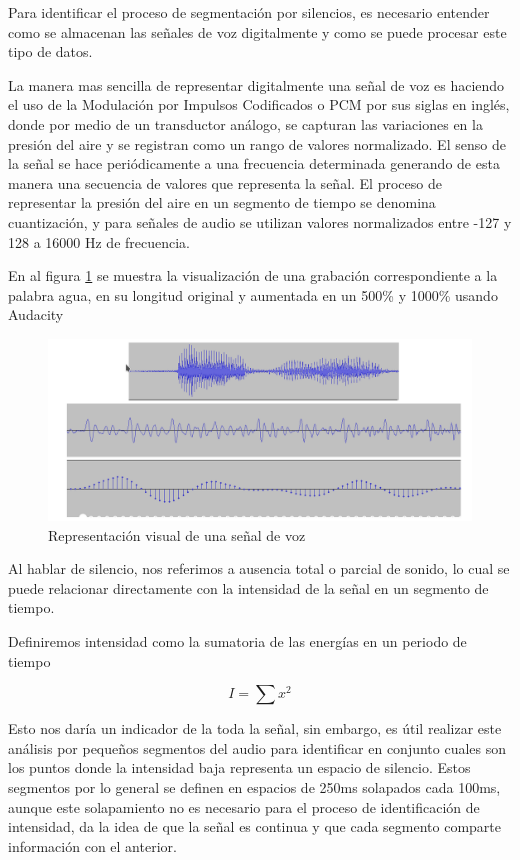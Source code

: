 \documentclass[a4paper,12pt,twoside]{report}
\begin{document}
Para identificar el proceso de segmentación por silencios, es necesario entender como se almacenan las señales de voz digitalmente y como se puede procesar este tipo de datos.

La manera mas sencilla de representar digitalmente una señal de voz es haciendo el uso de la Modulación por Impulsos Codificados o PCM por sus siglas en inglés, donde por medio de un transductor análogo, se capturan las variaciones en la presión del aire y se registran como un rango de valores normalizado. El senso de la señal se hace periódicamente a una frecuencia determinada generando de esta manera una secuencia de valores que representa la señal. El proceso de representar la presión del aire en un segmento de tiempo se denomina cuantización, y para señales de audio se utilizan valores normalizados entre -127 y 128 a 16000 Hz de frecuencia.

En al figura \ref{img:pcm} se muestra la visualización de una grabación correspondiente a la palabra agua, en su longitud original y aumentada en un 500\% y 1000\% usando Audacity \cite{audacity}
\begin{figure}[H]
\caption{Representación visual de una señal de voz \cite{hableomsDeVoz}}
\label{img:pcm}
\includegraphics[width=\textwidth]{imagenes/04_01_pcm.png}
\end{figure}

Al hablar de silencio, nos referimos a ausencia total o parcial de sonido, lo cual se puede relacionar directamente con la intensidad de la señal en un segmento de tiempo.

Definiremos intensidad como la sumatoria de las energías en un periodo de tiempo  \cite{Jurafsky2000SpeechRecognition}    

\begin{equation}
\label{eq:energy}
I = \sum{x^2}  
\end{equation}

Esto nos daría un indicador de la toda la señal, sin embargo, es útil realizar este análisis por pequeños segmentos del audio para identificar en conjunto cuales son los puntos donde la intensidad baja representa un espacio de silencio. Estos segmentos por lo general se definen en espacios de 250ms solapados cada 100ms, aunque este solapamiento no es necesario para el proceso de identificación de intensidad, da la idea de que la señal es continua y que cada segmento comparte información con el anterior.
\end{document}
